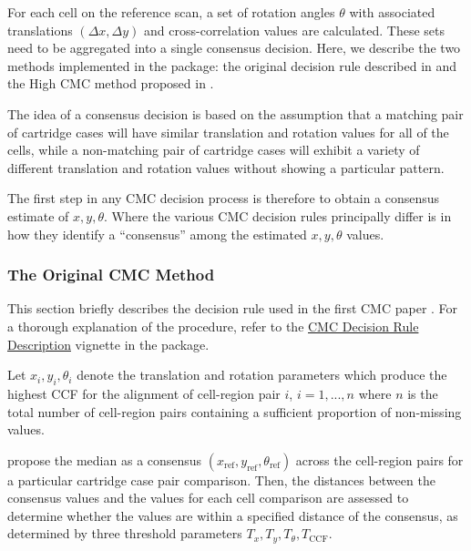 For each cell on the reference scan, a set of rotation angles \(\theta\)
with associated translations \((\Delta x, \Delta y)\) and
cross-correlation values are calculated. These sets need to be
aggregated into a single consensus decision. Here, we describe the two
methods implemented in the  package: the original decision
rule described in \citet{song_3d_2014} and the High CMC method proposed
in \citep{tong_improved_2015}.

The idea of a consensus decision is based on the assumption that a
matching pair of cartridge cases will have similar translation and
rotation values for all of the cells, while a non-matching pair of
cartridge cases will exhibit a variety of different translation and
rotation values without showing a particular pattern.

The first step in any CMC decision process is therefore to obtain a
consensus estimate of \(x, y, \theta\). Where the various CMC decision
rules principally differ is in how they identify a ``consensus'' among
the estimated \(x,y, \theta\) values.

\hypertarget{originalMethod}{%
\subsubsection{The Original CMC Method}\label{originalMethod}}

This section briefly describes the decision rule used in the first CMC
paper \citep{song_proposed_2013}. For a thorough explanation of the
procedure, refer to the
\href{https://csafe-isu.github.io/cmcR/articles/decisionRuleDescription.html}{CMC
Decision Rule Description} vignette in the  package.

Let \(x_i, y_i, \theta_i\) denote the translation and rotation
parameters which produce the highest CCF for the alignment of
cell-region pair \(i\), \(i = 1,...,n\) where \(n\) is the total number
of cell-region pairs containing a sufficient proportion of non-missing
values.

\citet{song_proposed_2013} propose the median as a consensus
\((x_{\text{ref}}, y_{\text{ref}}, \theta_{\text{ref}})\) across the
cell-region pairs for a particular cartridge case pair comparison. Then,
the distances between the consensus values and the values for each cell
comparison are assessed to determine whether the values are within a
specified distance of the consensus, as determined by three threshold
parameters \(T_{x}, T_{y}, T_\theta, T_{\text{CCF}}\).

